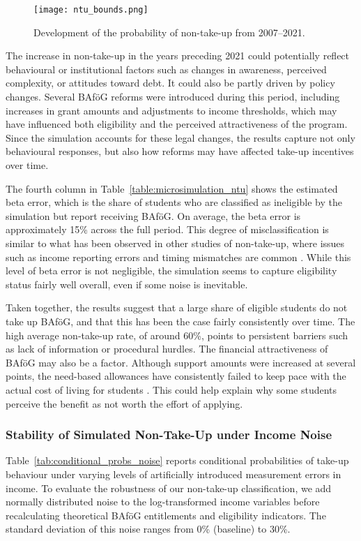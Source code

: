 \begin{figure}[htbp]
  \centering
  \texttt{[image: ntu\_bounds.png]}
  \caption{Development of the probability of non-take-up from 2007--2021.}
  \label{fig:ntu_bounds_over_years}
\end{figure}

The increase in non-take-up in the years preceding 2021 could potentially reflect behavioural or institutional factors such as changes in awareness, perceived complexity, or attitudes toward debt. 
It could also be partly driven by policy changes. 
Several BAföG reforms were introduced during this period, including increases in grant amounts and adjustments to income thresholds, which may have influenced both eligibility and the perceived attractiveness of the program. 
Since the simulation accounts for these legal changes, the results capture not only behavioural responses, but also how reforms may have affected take-up incentives over time.


The fourth column in Table~\ref{table:microsimulation_ntu} shows the estimated beta error, which is the share of students who are classified as ineligible by the simulation but report receiving BAföG. 
On average, the beta error is approximately 15\% across the full period. 
This degree of misclassification is similar to what has been observed in other studies of non-take-up, where issues such as income reporting errors and timing mismatches are common \citep{frick_claim_2007}.
While this level of beta error is not negligible, the simulation seems to capture eligibility status fairly well overall, even if some noise is inevitable.

Taken together, the results suggest that a large share of eligible students do not take up BAföG, and that this has been the case fairly consistently over time. 
The high average non-take-up rate, of around 60\%, points to persistent barriers such as lack of information or procedural hurdles. 
The financial attractiveness of BAföG may also be a factor. 
Although support amounts were increased at several points, the need-based allowances have consistently failed to keep pace with the actual cost of living for students \citep{staack_von_2017}. 
This could help explain why some students perceive the benefit as not worth the effort of applying. 


\subsubsection{Stability of Simulated Non-Take-Up under Income Noise}
Table~\ref{tab:conditional_probs_noise} reports conditional probabilities of take-up behaviour under varying levels of artificially introduced measurement errors in income. 
To evaluate the robustness of our non-take-up classification, we add normally distributed noise to the log-transformed income variables before recalculating theoretical BAföG entitlements and eligibility indicators. 
The standard deviation of this noise ranges from 0\% (baseline) to 30\%.

